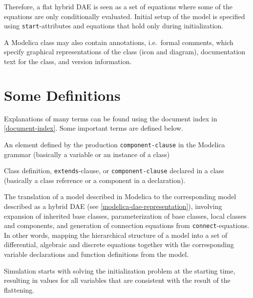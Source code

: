 Therefore, a flat hybrid DAE is seen as a set of equations where some of the equations are only conditionally evaluated.
Initial setup of the model is specified using \lstinline!start!-attributes and equations that hold only during initialization.

A Modelica class may also contain annotations, i.e.\ formal comments, which specify graphical representations of the class (icon and diagram), documentation text for the class, and version information.

\section{Some Definitions}\label{some-definitions}

Explanations of many terms can be found using the document index in \cref{document-index}.
Some important terms are defined below.

\begin{definition}[Component]
An element defined by the production \lstinline[language=grammar]!component-clause! in the Modelica grammar (basically a variable or an instance of a class)
\end{definition}

\begin{definition}[Element]
Class definition, \lstinline!extends!-clause, or \lstinline[language=grammar]!component-clause! declared in a class (basically a class reference or a component in a declaration).
\end{definition}

\begin{definition}[Flattening]
The translation of a model described in Modelica to the corresponding model described as a hybrid DAE (see \cref{modelica-dae-representation}), involving expansion of inherited base classes, parameterization of base classes, local classes and components, and generation of connection equations from \lstinline!connect!-equations.
In other words, mapping the hierarchical structure of a model into a set of differential, algebraic and discrete equations together with the corresponding variable declarations and function definitions from the model.
\end{definition}

\begin{definition}[Initialization]
Simulation starts with solving the initialization problem at the starting time, resulting in values for all variables that are consistent with the result of the flattening.
\end{definition}

